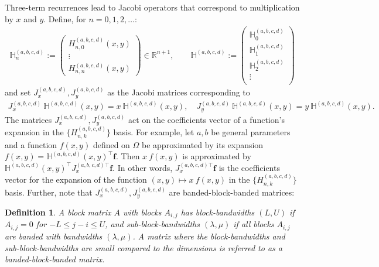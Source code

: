 \documentclass[11pt, oneside]{article}   	%
\newcommand{\R}{\mathbb{R}}
\newcommand{\hdop}{H}
\newcommand{\bighdop}{\mathbb{\hdop}}
\newcommand{\hdopnkabcd}{\hdop_{n,k}^{(a,b,c,d)}}
\newcommand{\hdopabcd}{\hdop^{(a,b,c,d)}}
\newcommand{\bighdopabcd}{\bighdop^{(a,b,c,d)}}
\newtheorem{definition}{Definition}
\begin{document}
Three-term recurrences lead to Jacobi operators that correspond to multiplication by $x$ and $y$. Define, for $n=0,1,2,\dots$: 
\begin{align*}
\bighdopabcd_n := \begin{pmatrix}
		\hdopabcd_{n,0}(x,y) \\
		\vdots \\
		\hdopabcd_{n,n}(x,y)
	\end{pmatrix} \in \R^{n+1}, 
\quad \quad 
\bighdopabcd := \begin{pmatrix}
		\bighdopabcd_0 \\
		\bighdopabcd_1 \\
		\bighdopabcd_2 \\
		\vdots \\
	\end{pmatrix}
\end{align*}
and set $J_x^{(a,b,c,d)}, J_y^{(a,b,c,d)}$ as the Jacobi matrices corresponding to
\begin{align}
J_x^{(a,b,c,d)} \: \bighdopabcd(x,y) = x \: \bighdopabcd(x,y), \quad J_y^{(a,b,c,d)} \: \bighdopabcd(x,y) = y \: \bighdopabcd(x,y).
\label{eqn:jacobimatricesdefinition}
\end{align}
The matrices $J_x^{(a,b,c,d)}, J_y^{(a,b,c,d)}$ act on the coefficients vector of a function's expansion in the $\{\hdopnkabcd\}$ basis. For example, let $a, b$ be general parameters and a function $f(x,y)$ defined on $\Omega$ be approximated by its expansion $f(x,y) = \bighdopabcd(x,y)^\top \mathbf{f}$. Then $x \: f(x,y)$ is approximated by $\bighdopabcd(x,y)^\top {J_x^{(a,b,c,d)\top}} \mathbf{f}$. In other words, ${J_x^{(a,b,c,d)\top}} \mathbf{f}$ is the coefficients vector for the expansion of the function $(x,y) \mapsto x \: f(x,y)$ in the  $\{\hdopnkabcd\}$ basis. Further, note that $J_x^{(a,b,c,d)}, J_y^{(a,b,c,d)}$ are banded-block-banded matrices:

\begin{definition}
A block matrix $A$ with blocks $A_{i,j}$ has block-bandwidths $(L,U)$ if $A_{i,j} = 0$ for $- L \leq j-i \leq U$, and sub-block-bandwidths $(\lambda, \mu)$ if all blocks $A_{i,j}$ are banded with bandwidths $(\lambda,\mu)$. A matrix where the block-bandwidths and sub-block-bandwidths are small compared to the dimensions is referred to as a banded-block-banded matrix. 
\end{definition}
\end{document}
